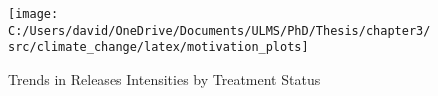 \begin{figure}[H]
    \centering
    \texttt{[image: C:/Users/david/OneDrive/Documents/ULMS/PhD/Thesis/chapter3/src/climate\_change/latex/motivation\_plots]}
    \caption{Trends in Releases Intensities by Treatment Status}
    \label{fig:releases-plots-treatment}
\end{figure}